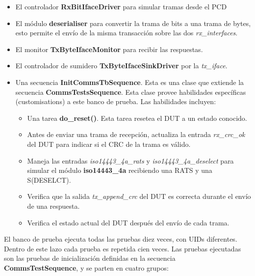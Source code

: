 \documentclass[a4paper, twoside, 11pt]{report}
\begin{document}
\begin{itemize}
  \item El controlador \textbf{RxBitIfaceDriver} para simular tramas desde el PCD
  \item El módulo \textbf{deserialiser} para convertir la trama de bits a una trama de bytes, esto permite el envío de la misma transacción sobre las dos \textit{rx\_interfaces}.
  \item El monitor \textbf{TxByteIfaceMonitor} para recibir las respuestas.
  \item El controlador de sumidero \textbf{TxByteIfaceSinkDriver} por la \textit{tx\_iface}.
  \item Una secuencia \textbf{InitCommsTbSequence}. Esta es una clase que extiende la secuencia \textbf{CommsTestsSequence}. Esta clase provee habilidades específicas (customisations) a este banco de prueba. Las habilidades incluyen:
  \begin{itemize}[label=$\circ$]
    \item Una tarea \textbf{do\_reset()}. Esta tarea resetea el DUT a un estado conocido.
    \item Antes de enviar una trama de recepción, actualiza la entrada \textit{rx\_crc\_ok} del DUT para indicar si el CRC de la trama es válido.
    \item Maneja las entradas \textit{iso14443\_4a\_rats} y \textit{iso14443\_4a\_deselect} para simular el módulo \textbf{iso14443\_4a} recibiendo una RATS y una S(DESELCT).
    \item Verifica que la salida \textit{tx\_append\_crc} del DUT es correcta durante el envío de una respuesta.
    \item Verifica el estado actual del DUT después del envío de cada trama.
  \end{itemize}
\end{itemize}

El banco de prueba ejecuta todas las pruebas diez veces, con UIDs diferentes. Dentro de este lazo cada prueba es repetida cien veces. Las pruebas ejecutadas son las pruebas de inicialización definidas en la secuencia \textbf{CommsTestSequence}, y se parten en cuatro grupos:
\end{document}
